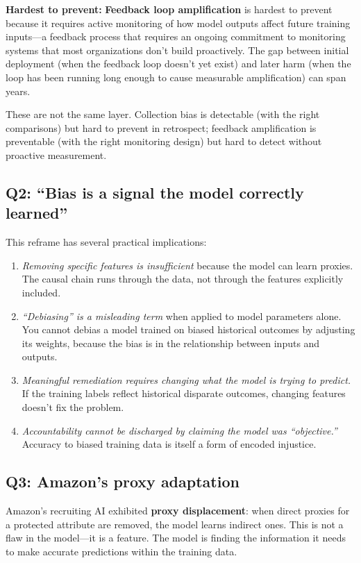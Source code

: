 \textbf{Hardest to prevent:} \textbf{Feedback loop amplification} is hardest to prevent because it requires active monitoring of how model outputs affect future training inputs---a feedback process that requires an ongoing commitment to monitoring systems that most organizations don't build proactively. The gap between initial deployment (when the feedback loop doesn't yet exist) and later harm (when the loop has been running long enough to cause measurable amplification) can span years.

These are not the same layer. Collection bias is detectable (with the right comparisons) but hard to prevent in retrospect; feedback amplification is preventable (with the right monitoring design) but hard to detect without proactive measurement.

\subsection*{Q2: ``Bias is a signal the model correctly learned''}

This reframe has several practical implications:

\begin{enumerate}
    \item \textit{Removing specific features is insufficient} because the model can learn proxies. The causal chain runs through the data, not through the features explicitly included.
    \item \textit{``Debiasing'' is a misleading term} when applied to model parameters alone. You cannot debias a model trained on biased historical outcomes by adjusting its weights, because the bias is in the relationship between inputs and outputs.
    \item \textit{Meaningful remediation requires changing what the model is trying to predict.} If the training labels reflect historical disparate outcomes, changing features doesn't fix the problem.
    \item \textit{Accountability cannot be discharged by claiming the model was ``objective.''} Accuracy to biased training data is itself a form of encoded injustice.
\end{enumerate}

\subsection*{Q3: Amazon's proxy adaptation}

Amazon's recruiting AI exhibited \textbf{proxy displacement}: when direct proxies for a protected attribute are removed, the model learns indirect ones. This is not a flaw in the model---it is a feature. The model is finding the information it needs to make accurate predictions within the training data.


